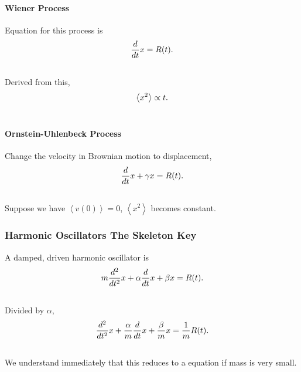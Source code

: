 \documentclass[letterpaper,10pt,english]{sphinxmanual}
\newcommand{\avg}[1]{\left< #1 \right>}
\begin{document}
\paragraph{Wiener Process}
\label{nonequilibrium/brownianMotion:wiener-process}
Equation for this process is
\begin{gather}
\begin{split}\frac{d}{dt} x = R(t).\end{split}\notag\\\begin{split}\end{split}\notag
\end{gather}
Derived from this,
\begin{gather}
\begin{split}\avg{x^2} \propto t.\end{split}\notag\\\begin{split}\end{split}\notag
\end{gather}

\paragraph{Ornstein-Uhlenbeck Process}
\label{nonequilibrium/brownianMotion:ornstein-uhlenbeck-process}
Change the velocity in Brownian motion to displacement,
\begin{gather}
\begin{split}\frac{d}{dt} x + \gamma x  =  R(t).\end{split}\notag\\\begin{split}\end{split}\notag
\end{gather}
Suppose we have $\avg{v(0)}=0$, $\avg{x^2}$ becomes constant.


\subsubsection{Harmonic Oscillators The Skeleton Key}
\label{nonequilibrium/brownianMotion:harmonic-oscillators-the-skeleton-key}
A damped, driven harmonic oscillator is
\begin{gather}
\begin{split}m \frac{d^2}{dt^2} x  + \alpha \frac{d}{dt} x + \beta x = R(t)  .\end{split}\notag\\\begin{split}\end{split}\notag
\end{gather}
Divided by $\alpha$,
\begin{gather}
\begin{split}\frac{d^2}{dt^2} x  + \frac{\alpha}{m} \frac{d}{dt} x + \frac{\beta}{m} x = \frac{1}{m}R(t)  .\end{split}\notag\\\begin{split}\end{split}\notag
\end{gather}
We understand immediately that this reduces to a  equation if mass is very small.
\end{document}
